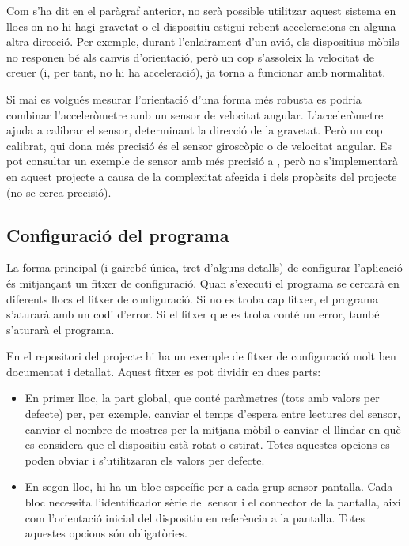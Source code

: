Com s'ha dit en el paràgraf anterior, no serà possible utilitzar aquest sistema en
llocs on no hi hagi gravetat o el dispositiu estigui rebent acceleracions en
alguna altra direcció. Per exemple, durant l'enlairament d'un avió, els
dispositius mòbils no responen bé als canvis d'orientació, però un cop
s'assoleix la velocitat de creuer (i, per tant, no hi ha acceleració), ja torna
a funcionar amb normalitat.

Si mai es volgués mesurar l'orientació d'una forma més robusta es podria combinar
l'acceleròmetre amb un sensor de velocitat angular. L'acceleròmetre ajuda a
calibrar el sensor, determinant la direcció de la gravetat. Però un
cop calibrat, qui dona més precisió és el sensor giroscòpic o de velocitat
angular. Es pot consultar un exemple de sensor amb més precisió a
\cite{6702711}, però no s'implementarà en aquest projecte a causa de la complexitat
afegida i dels propòsits del projecte (no se cerca precisió).

\subsection{Configuració del programa}

La forma principal (i gairebé única, tret d'alguns detalls) de configurar
l'aplicació és mitjançant un fitxer de configuració. Quan s'executi el programa
se cercarà en diferents llocs el fitxer de configuració. Si no es troba cap
fitxer, el programa s'aturarà amb un codi d'error. Si el fitxer que es troba
conté un error, també s'aturarà el programa.

En el repositori del projecte hi ha un exemple de fitxer de configuració molt
ben documentat i detallat. Aquest fitxer es pot dividir en dues parts:

\begin{itemize}
    \item En primer lloc, la part global, que conté paràmetres (tots amb valors
    per defecte) per, per exemple, canviar el temps d'espera entre lectures
    del sensor, canviar el nombre de mostres per la mitjana mòbil o canviar
    el llindar en què es considera que el dispositiu està rotat o estirat.
    Totes aquestes opcions es poden obviar i s'utilitzaran els valors per defecte.
    \item En segon lloc, hi ha un bloc específic per a cada grup sensor-pantalla.
    Cada bloc necessita l'identificador sèrie del sensor i el connector de la
    pantalla, així com l'orientació inicial del dispositiu en referència a la
    pantalla. Totes aquestes opcions són obligatòries.
\end{itemize}

